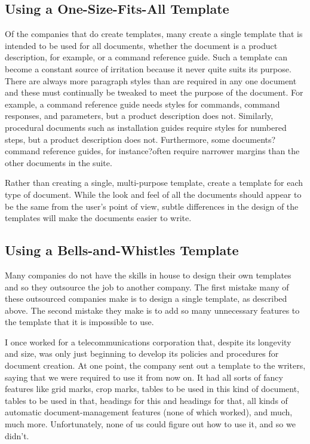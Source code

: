 \documentclass[12pt]{article}
\begin{document}
\subsection{Using a One-Size-Fits-All Template}
Of the companies that do create templates, many create a single template that is intended to be used for all documents, whether the document is a product description, for example, or a command reference guide. Such a template can become a constant source of irritation because it never quite suits its purpose. There are always more paragraph styles than are required in any one document and these must continually be tweaked to meet the purpose of the document. For example, a command reference guide needs styles for commands, command responses, and parameters, but a product description does not. Similarly, procedural documents such as installation guides require styles for numbered steps, but a product description does not. Furthermore, some documents?command reference guides, for instance?often require narrower margins than the other documents in the suite.

Rather than creating a single, multi-purpose template, create a template for each type of document. While the look and feel of all
the documents should appear to be the same from the user's point of view, subtle differences in the design of the templates will make the documents easier to write.

\subsection{Using a Bells-and-Whistles Template}
Many companies do not have the skills in house to design their own templates and so they outsource the job to another company. The first mistake many of these outsourced companies make is to design a single template, as described above. The second mistake they make is to add so many unnecessary features to the template that it is impossible to use. 

I once worked for a telecommunications corporation that, despite its longevity and size, was only just beginning to develop its policies and procedures for document creation. At one point, the company sent out a template to the writers, saying that we were
required to use it from now on. It had all sorts of fancy features like grid marks, crop marks, tables to be used in this kind of document, tables to be used in that, headings for this and headings for that, all kinds of automatic document-management features (none of which worked), and much, much more. Unfortunately, none of us could figure out how to use it, and so we didn't.
\end{document}
